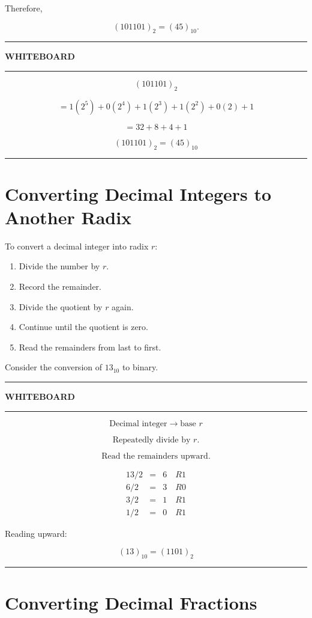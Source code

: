 \documentclass[11pt]{article}
\newenvironment{whiteboard}
{
    \par\medskip
    \begin{center}
    \begin{minipage}{0.94\textwidth}
    \hrule
    \vspace{0.4em}
    \textbf{\large WHITEBOARD}
    \vspace{0.3em}
    \hrule
    \vspace{0.7em}
}
{
    \vspace{0.5em}
    \hrule
    \end{minipage}
    \end{center}
    \medskip
}
\begin{document}
Therefore,

\[
(101101)_2=(45)_{10}.
\]

\begin{whiteboard}
\[
(101101)_2
\]

\[
=1(2^5)+0(2^4)+1(2^3)+1(2^2)+0(2)+1
\]

\[
=32+8+4+1
\]

\[
\boxed{(101101)_2=(45)_{10}}
\]
\end{whiteboard}

\section{Converting Decimal Integers to Another Radix}

To convert a decimal integer into radix \(r\):

\begin{enumerate}
    \item Divide the number by \(r\).
    \item Record the remainder.
    \item Divide the quotient by \(r\) again.
    \item Continue until the quotient is zero.
    \item Read the remainders from last to first.
\end{enumerate}

Consider the conversion of \(13_{10}\) to binary.

\begin{whiteboard}
\[
\boxed{\text{Decimal integer}\rightarrow\text{base }r}
\]

\[
\text{Repeatedly divide by }r.
\]

\[
\text{Read the remainders upward.}
\]

\[
\begin{array}{rcl}
13/2 &=& 6\quad R1\\
6/2  &=& 3\quad R0\\
3/2  &=& 1\quad R1\\
1/2  &=& 0\quad R1
\end{array}
\]

Reading upward:

\[
\boxed{(13)_{10}=(1101)_2}
\]
\end{whiteboard}

\section{Converting Decimal Fractions}
\end{document}
